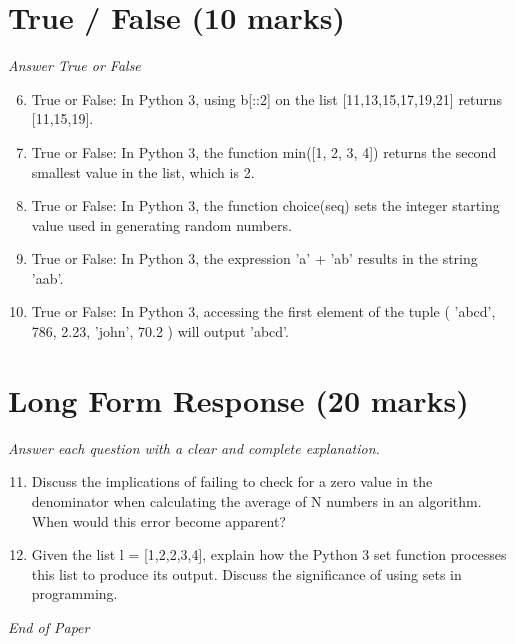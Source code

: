 \documentclass[12pt]{article}
\begin{document}
\section*{True / False (10 marks)}
\textit{Answer True or False}
\begin{enumerate}[label=\arabic*.]
\setcounter{enumi}{5}
\item True or False: In Python 3, using b[::2] on the list [11,13,15,17,19,21] returns [11,15,19].
\item True or False: In Python 3, the function min([1, 2, 3, 4]) returns the second smallest value in the list, which is 2.
\item True or False: In Python 3, the function choice(seq) sets the integer starting value used in generating random numbers.
\item True or False: In Python 3, the expression 'a' + 'ab' results in the string 'aab'.
\item True or False: In Python 3, accessing the first element of the tuple ( 'abcd', 786, 2.23, 'john', 70.2 ) will output 'abcd'.
\end{enumerate}

\section*{Long Form Response (20 marks)}
\textit{Answer each question with a clear and complete explanation.}
\begin{enumerate}[label=\arabic*.]
\setcounter{enumi}{10}
\item Discuss the implications of failing to check for a zero value in the denominator when calculating the average of N numbers in an algorithm. When would this error become apparent?
\item Given the list l = [1,2,2,3,4], explain how the Python 3 set function processes this list to produce its output. Discuss the significance of using sets in programming.
\end{enumerate}

\vfill
\noindent\textit{End of Paper}
\end{document}
